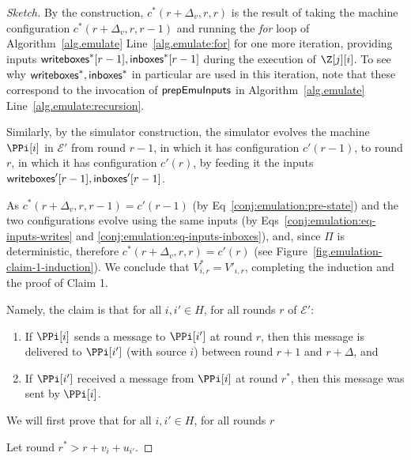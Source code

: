 \begin{proof}[Sketch]
  By the \rollerblade construction,
  $c^*(r + \Delta_v, r, r)$ is the result of
  taking the machine configuration
  $c^*(r + \Delta_v, r, r - 1)$
  and running the \emph{for} loop of Algorithm~\ref{alg.emulate} Line~\ref{alg.emulate:for}
  for one more iteration, providing inputs $\textsf{writeboxes}^*[r - 1], \textsf{inboxes}^*[r - 1]$
  during the execution of $\Z[j][i]$.
  To see why $\textsf{writeboxes}^*, \textsf{inboxes}^*$ in particular are used in this iteration,
  note that these correspond to the invocation of $\textsf{prepEmuInputs}$ in
  Algorithm~\ref{alg.emulate} Line~\ref{alg.emulate:recursion}.

  Similarly, by the simulator construction, %
  the simulator evolves the machine $\PPi[i]$ in $\mathcal{E}'$ from round $r - 1$,
  in which it has configuration $c'(r - 1)$,
  to round $r$,
  in which it has configuration $c'(r)$,
  by feeding it the inputs $\textsf{writeboxes}'[r - 1], \textsf{inboxes}'[r - 1]$.

  As $c^*(r + \Delta_v, r, r - 1) = c'(r - 1)$ (by Eq~\ref{conj:emulation:pre-state})
  and the two configurations evolve using the same inputs (by
  Eqs~\ref{conj:emulation:eq-inputs-writes} and \ref{conj:emulation:eq-inputs-inboxes}),
  and, since $\Pi$ is deterministic,
  therefore $c^*(r + \Delta_v, r, r) = c'(r)$ (see Figure~\ref{fig.emulation-claim-1-induction}).
  We conclude that $V^*_{i,r} = V'_{i,r}$, completing the induction
  and the proof of Claim 1.

  Namely, the claim is that for all $i, i' \in H$, for all rounds $r$ of $\mathcal{E}'$:

  \begin{enumerate}[label=(\alph*)]
    \item
    \label{conj:emulation:claim-delta-a}
    If $\PPi[i]$ sends a message to $\PPi[i']$ at round $r$, then this message is delivered to $\PPi[i']$
    (with source $i$) between round $r + 1$ and $r + \Delta$, and

    \item
    \label{conj:emulation:claim-delta-b}
    If $\PPi[i']$ received a message from $\PPi[i]$ at round $r^*$, then this message was sent by $\PPi[i]$.
  \end{enumerate}

  We will first prove that for all $i, i' \in H$, for all rounds $r$

  Let round $r^* > r + v_i + u_{i'}$.


\end{proof}

